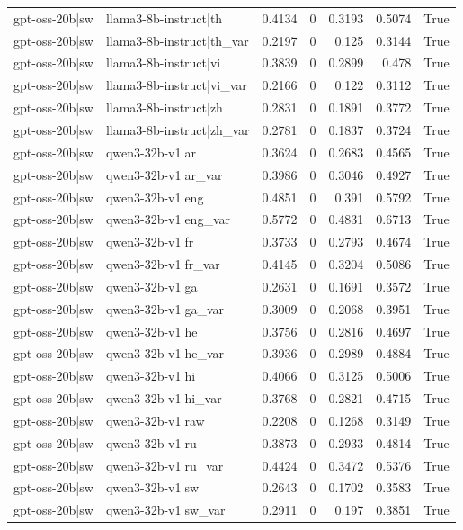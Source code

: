 \begin{table}
\begin{tabular}{l l r r r r l}
gpt-oss-20b|sw & llama3-8b-instruct|th & 0.4134 & 0 & 0.3193 & 0.5074 & True \\
gpt-oss-20b|sw & llama3-8b-instruct|th_var & 0.2197 & 0 & 0.125 & 0.3144 & True \\
gpt-oss-20b|sw & llama3-8b-instruct|vi & 0.3839 & 0 & 0.2899 & 0.478 & True \\
gpt-oss-20b|sw & llama3-8b-instruct|vi_var & 0.2166 & 0 & 0.122 & 0.3112 & True \\
gpt-oss-20b|sw & llama3-8b-instruct|zh & 0.2831 & 0 & 0.1891 & 0.3772 & True \\
gpt-oss-20b|sw & llama3-8b-instruct|zh_var & 0.2781 & 0 & 0.1837 & 0.3724 & True \\
gpt-oss-20b|sw & qwen3-32b-v1|ar & 0.3624 & 0 & 0.2683 & 0.4565 & True \\
gpt-oss-20b|sw & qwen3-32b-v1|ar_var & 0.3986 & 0 & 0.3046 & 0.4927 & True \\
gpt-oss-20b|sw & qwen3-32b-v1|eng & 0.4851 & 0 & 0.391 & 0.5792 & True \\
gpt-oss-20b|sw & qwen3-32b-v1|eng_var & 0.5772 & 0 & 0.4831 & 0.6713 & True \\
gpt-oss-20b|sw & qwen3-32b-v1|fr & 0.3733 & 0 & 0.2793 & 0.4674 & True \\
gpt-oss-20b|sw & qwen3-32b-v1|fr_var & 0.4145 & 0 & 0.3204 & 0.5086 & True \\
gpt-oss-20b|sw & qwen3-32b-v1|ga & 0.2631 & 0 & 0.1691 & 0.3572 & True \\
gpt-oss-20b|sw & qwen3-32b-v1|ga_var & 0.3009 & 0 & 0.2068 & 0.3951 & True \\
gpt-oss-20b|sw & qwen3-32b-v1|he & 0.3756 & 0 & 0.2816 & 0.4697 & True \\
gpt-oss-20b|sw & qwen3-32b-v1|he_var & 0.3936 & 0 & 0.2989 & 0.4884 & True \\
gpt-oss-20b|sw & qwen3-32b-v1|hi & 0.4066 & 0 & 0.3125 & 0.5006 & True \\
gpt-oss-20b|sw & qwen3-32b-v1|hi_var & 0.3768 & 0 & 0.2821 & 0.4715 & True \\
gpt-oss-20b|sw & qwen3-32b-v1|raw & 0.2208 & 0 & 0.1268 & 0.3149 & True \\
gpt-oss-20b|sw & qwen3-32b-v1|ru & 0.3873 & 0 & 0.2933 & 0.4814 & True \\
gpt-oss-20b|sw & qwen3-32b-v1|ru_var & 0.4424 & 0 & 0.3472 & 0.5376 & True \\
gpt-oss-20b|sw & qwen3-32b-v1|sw & 0.2643 & 0 & 0.1702 & 0.3583 & True \\
gpt-oss-20b|sw & qwen3-32b-v1|sw_var & 0.2911 & 0 & 0.197 & 0.3851 & True \\

\end{tabular}
\end{table}
